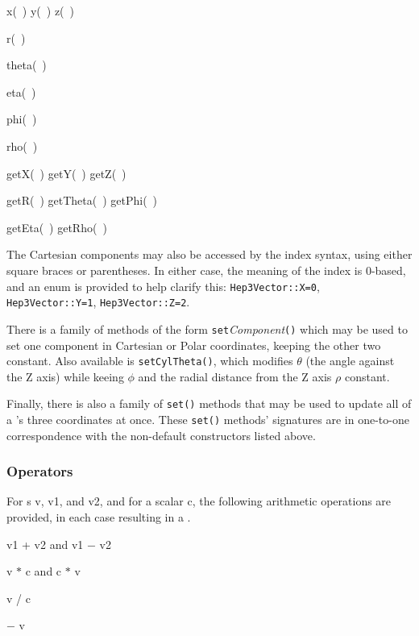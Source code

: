 \begin{shortlist}
  \item x(~) \/\/\/ y(~) \/\/\/ z(~) 
  \item r(~) \see{\ref{eq:polar}}
  \item theta(~) \see{\ref{eq:polar}}
  \item eta(~) \see{\ref{eq:spherical}}
  \item phi(~) \see{\ref{eq:polar}, \ref{eq:cylindrical}}
  \item rho(~) \see{\ref{eq:cylindrical}}
  \item getX(~) \/\/\/ getY(~) \/\/\/ getZ(~) 
  \item getR(~) \/\/\/ getTheta(~) \/\/\/ getPhi(~)
  \item getEta(~) \/\/\/ getRho(~)
\end{shortlist}

\noindent
The Cartesian components may also be accessed by the index syntax, 
using either square braces or parentheses.  
In either case, the meaning of the index is 0-based, 
and an enum is provided to help clarify this: {\tt Hep3Vector::X=0},
{\tt Hep3Vector::Y=1}, {\tt Hep3Vector::Z=2}.

\noindent
There is a family of methods of the form
{\tt set}{\it Component}{\tt ()} which may be used to set 
one component in Cartesian or Polar coordinates, keeping the other
two constant.  
Also available is {\tt setCylTheta()}, which modifies $\theta$ (the angle
against the Z axis) while keeing $\phi$ and the radial distance from the 
Z axis $\rho$ constant.

\noindent
Finally, there is also a family of {\tt set()} methods
that may be used to update all of a \SV 's three coordinates at once.
These {\tt set()} methods' signatures are in one-to-one correspondence
with the non-default constructors listed above.

\subsubsection{Operators}

For \SV s v, v1, and v2, and for a scalar c,
the following arithmetic operations are provided,
in each case resulting in a \SV .

\begin{shortlist}
  \item v1 + v2  and  v1 $-$ v2
  \item v $*$ c  and  c $*$ v
  \item v / c
  \item $-$ v
\end{shortlist}

